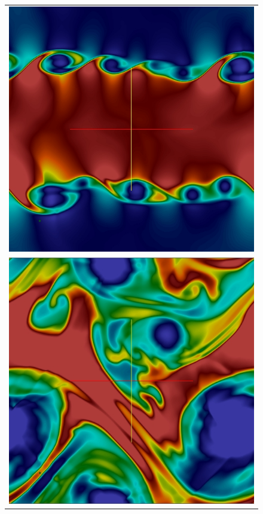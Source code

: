 \begin{figure}[htbp]\figSpace
\begin{center} 
\begin{tabular}{c}
\includegraphics[width=0.4\textheight]{fig/kh1.jpg} \\ 
\includegraphics[width=0.4\textheight]{fig/kh5.jpg} 

\end{tabular}
\end{center}
\end{figure}
